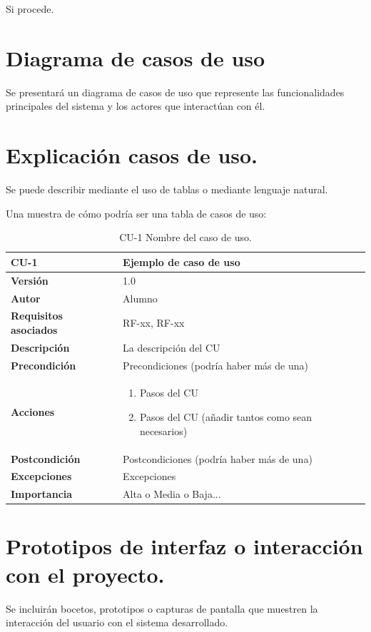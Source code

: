 
Si procede.


\section{Diagrama de casos de uso}
Se presentará un diagrama de casos de uso que represente las funcionalidades principales del sistema y los actores que interactúan con él.

\section{Explicación casos de uso.}

Se puede describir mediante el uso de tablas o mediante lenguaje natural.    

Una muestra de cómo podría ser una tabla de casos de uso:

\begin{table}[p]
	\centering
	\begin{tabularx}{\linewidth}{ p{} p{} }
		\toprule
		\textbf{CU-1}    & \textbf{Ejemplo de caso de uso}\\
		\toprule
		\textbf{Versión}              & 1.0    \\
		\textbf{Autor}                & Alumno \\
		\textbf{Requisitos asociados} & RF-xx, RF-xx \\
		\textbf{Descripción}          & La descripción del CU \\
		\textbf{Precondición}         & Precondiciones (podría haber más de una) \\
		\textbf{Acciones}             &
		\begin{enumerate}
			\def\labelenumi{\arabic{enumi}.}
			\tightlist
			\item Pasos del CU
			\item Pasos del CU (añadir tantos como sean necesarios)
		\end{enumerate}\\
		\textbf{Postcondición}        & Postcondiciones (podría haber más de una) \\
		\textbf{Excepciones}          & Excepciones \\
		\textbf{Importancia}          & Alta o Media o Baja... \\
		\bottomrule
	\end{tabularx}
	\caption{CU-1 Nombre del caso de uso.}
\end{table}

\section{Prototipos de interfaz o interacción con el proyecto.}
Se incluirán bocetos, prototipos o capturas de pantalla que muestren la interacción del usuario con el sistema desarrollado.
